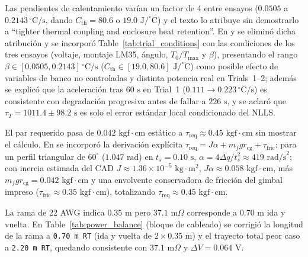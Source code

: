 \documentclass{LabDSTresponse}
\begin{document}
{Las pendientes de calentamiento varían un factor de 4 entre ensayos ($0.0505$ a $0.2143\,^\circ\text{C/s}$, dando $C_{\text{th}} = 80.6$ o $19.0\text{ J/}^\circ\text{C}$) y el texto lo atribuye sin demostrarlo a “tighter thermal coupling and enclosure heat retention”.}
{En  y  se eliminó dicha atribución y se incorporó Table~\ref{tab:trial_conditions} con las condiciones de los tres ensayos (voltaje, montaje LM35, ángulo, $T_0/T_{\max}$ y $\beta$), presentando el rango $\beta \in [0.0505, 0.2143]\,^\circ\text{C/s}$ ($C_{\text{th}} \in [19.0, 80.6]\text{ J/}^\circ\text{C}$) como posible efecto de variables de banco no controladas y distinta potencia real en Trials~1--2; además se explicó que la aceleración tras $60\text{ s}$ en Trial~1 ($0.111 \to 0.223\,^\circ\text{C/s}$) es consistente con degradación progresiva antes de fallar a $226\text{ s}$, y se aclaró que $\tau_T = 1011.4 \pm 98.2\text{ s}$ es solo el error estándar local condicionado del NLLS.}

{El par requerido pasa de $0.042\text{ kgf}\cdot\text{cm}$ estático a $\tau_{\text{req}} \approx 0.45\text{ kgf}\cdot\text{cm}$ sin mostrar el cálculo.}
{En  se incorporó la derivación explícita $\tau_{\text{req}} = J\alpha + m_f g r_{\text{cg}} + \tau_{\text{fric}}$: para un perfil triangular de $60^\circ$ ($1.047\text{ rad}$) en $t_s = 0.10\text{ s}$, $\alpha = 4\Delta q / t_s^2 \approx 419\text{ rad/s}^2$; con inercia estimada del CAD $J \approx 1.36\times 10^{-5}\text{ kg}\cdot\text{m}^2$, $J\alpha \approx 0.058\text{ kgf}\cdot\text{cm}$, más $m_f g r_{\text{cg}} = 0.042\text{ kgf}\cdot\text{cm}$ y una envolvente conservadora de fricción del gimbal impreso ($\tau_{\text{fric}} \approx 0.35\text{ kgf}\cdot\text{cm}$), totalizando $\tau_{\text{req}} \approx 0.45\text{ kgf}\cdot\text{cm}$.}

{La rama de 22 AWG indica $0.35\text{ m}$ pero $37.1\text{ m}\Omega$ corresponde a $0.70\text{ m}$ ida y vuelta.}
{En Table~\ref{tab:power_balance} (bloque de cableado) se corrigió la longitud de la rama a \texttt{0.70~m RT} (ida y vuelta de $2 \times 0.35\text{ m}$) y el trayecto total peor caso a \texttt{2.20~m RT}, quedando consistente con $37.1\text{ m}\Omega$ y $\Delta V = 0.064\text{ V}$.}

\end{document}
